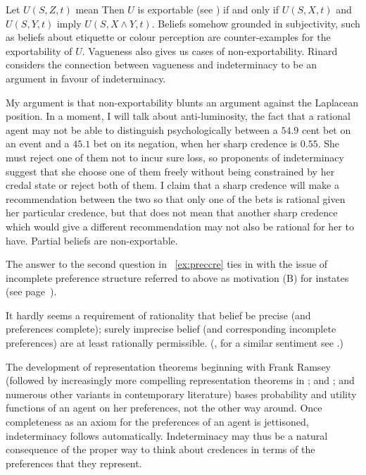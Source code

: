 \documentclass[phd,12pt,oneside]{ubcthesis}
\begin{document}
Let $U(S,Z,t)$ mean  Then $U$ is exportable (see ) if
and only if $U(S,X,t)$ and $U(S,Y,t)$ imply $U(S,X\wedge{}Y,t)$.
Beliefs somehow grounded in subjectivity, such as beliefs about
etiquette or colour perception are counter-examples for the
exportability of $U$. Vagueness also gives us cases of
non-exportability. Rinard considers the connection between vagueness
and indeterminacy to be an argument in favour of indeterminacy.

My argument is that non-exportability blunts an argument against the
Laplacean position. In a moment, I will talk about anti-luminosity,
the fact that a rational agent may not be able to distinguish
psychologically between a $54.9$ cent bet on an event and a $45.1$ bet
on its negation, when her sharp credence is $0.55$. She must reject
one of them not to incur sure loss, so proponents of indeterminacy
suggest that she choose one of them freely without being constrained
by her credal state or reject both of them. I claim that a sharp
credence will make a recommendation between the two so that only one
of the bets is rational given her particular credence, but that does
not mean that another sharp credence which would give a different
recommendation may not also be rational for her to have. Partial
beliefs are non-exportable.

The answer to the second question in {\xample}~\ref{ex:preccre} ties in
with the issue of incomplete preference structure referred to above as
motivation (B) for instates (see page~\pageref{page:houwieve}).

\begin{quotex}
  It hardly seems a requirement of rationality that belief be precise
  (and preferences complete); surely imprecise belief (and
  corresponding incomplete preferences) are at least rationally
  permissible. (, for a similar
  sentiment see .)
\end{quotex}

The development of representation theorems beginning with Frank Ramsey
(followed by increasingly more compelling representation theorems in
; and ; and numerous other
variants in contemporary literature) bases probability and utility
functions of an agent on her preferences, not the other way around.
Once completeness as an axiom for the preferences of an agent is
jettisoned, indeterminacy follows automatically. Indeterminacy may
thus be a natural consequence of the proper way to think about
credences in terms of the preferences that they represent.
\end{document}
